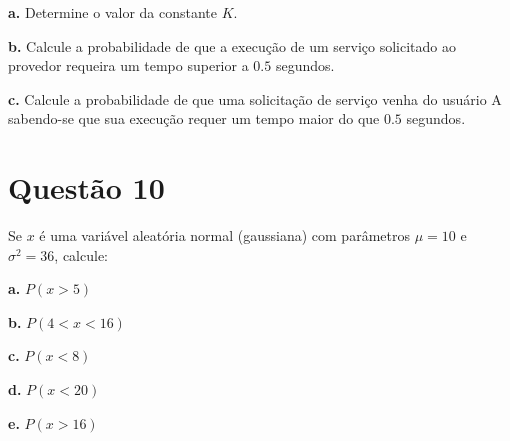 \documentclass[a5paper]{report}
\begin{document}
\textbf{a.} Determine o valor da constante $K$.


\textbf{b.} Calcule a probabilidade de que a execução de um serviço solicitado ao provedor requeira um tempo superior a $0.5$ segundos.


\textbf{c.} Calcule a probabilidade de que uma solicitação de serviço venha do usuário A sabendo-se que sua execução requer um tempo maior do que $0.5$ segundos.


\section*{Questão 10}
Se $x$ é uma variável aleatória normal (gaussiana) com parâmetros $\mu = 10$ e $\sigma^2 = 36$, calcule:

\textbf{a.} $P(x > 5)$

\textbf{b.} $P(4 < x< 16)$

\textbf{c.} $P(x < 8)$

\textbf{d.} $P(x < 20)$

\textbf{e.} $P(x > 16)$
	
\end{document}
